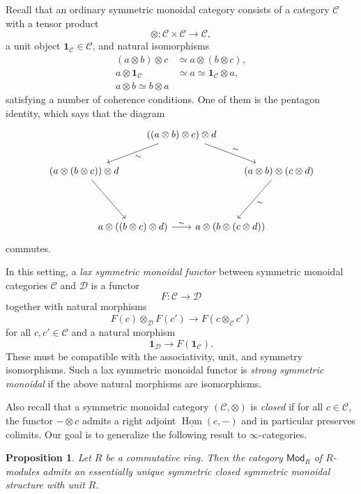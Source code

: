 \documentclass[10pt, oneside]{memoir}
\newtheorem{prop}[thm]{Proposition}
\theoremstyle{definition}
\theoremstyle{remark}
\theoremstyle{plain}
\theoremstyle{definition}
\theoremstyle{remark}
\newcommand{\mc}[1]{\mathcal{#1}}
\newcommand{\ms}[1]{\mathsf{#1}}
\newcommand{\ul}[1]{\underline{#1}}
\newcommand{\1}{\mathbf{1}}
\newcommand{\2}{\mathbf{2}}
\newcommand{\3}{\mathbf{3}}
\DeclareMathOperator{\Hom}{Hom}
\begin{document}
Recall that an ordinary symmetric monoidal category consists of a category $\mc{C}$ with a tensor product
\[ \otimes \colon \mc{C} \times \mc{C} \to \mc{C}, \]
a unit object $\1_{\mc{C}} \in \mc{C}$, and natural isomorphisms
\begin{align*}
    (a \otimes b) \otimes c &\simeq a \otimes (b \otimes c), \\
    a \otimes \1_{\mc{C}} &\simeq a \simeq \1_{\mc{C}} \otimes a, \\
    a \otimes b \simeq b \otimes a
\end{align*}
satisfying a number of coherence conditions. One of them is the pentagon identity, which says that the diagram
\begin{equation*}
\begin{tikzcd}[column sep=-3em, row sep=2em]
    & & ((a \otimes b) \otimes c) \otimes d \ar{drr}{\sim} \ar{dll}{\sim} & & \\
    (a \otimes (b \otimes c)) \otimes d \ar{ddr} & & & & (a \otimes b) \otimes (c \otimes d) \ar{ddl}{\sim} \\
    \\
    & a \otimes ((b \otimes c) \otimes d) \ar{rr}{\sim} & & a \otimes (b \otimes (c \otimes d))
\end{tikzcd}
\end{equation*}
commutes. 

In this setting, a \textit{lax symmetric monoidal functor} between symmetric monoidal categories $\mc{C}$ and $\mc{D}$ is a functor 
\[ F \colon \mc{C} \to \mc{D} \]
together with natural morphisms
\[ F(c) \otimes_{\mc{D}} F(c') \to F(c \otimes_{\mc{C}} c') \]
for all $c, c' \in \mc{C}$ and a natural morphism
\[ \1_{\mc{D}} \to F(\1_{\mc{C}}). \]
These must be compatible with the associativity, unit, and symmetry isomorphisms. Such a lax symmetric monoidal functor is \textit{strong symmetric monoidal} if the above natural morphisms are isomorphisms.

Also recall that a symmetric monoidal category $(\mc{C}, \otimes)$ is \textit{closed} if for all $c\in \mc{C}$, the functor $- \otimes c$ admits a right adjoint $\ul{\Hom}(c, -)$ and in particular preserves colimits. Our goal is to generalize the following result to $\infty$-categories.

\begin{prop}
    Let $R$ be a commutative ring. Then the category $\ms{Mod}_R$ of $R$-modules admits an essentially unique symmetric closed symmetric monoidal structure with unit $R$.
\end{prop}
\end{document}
